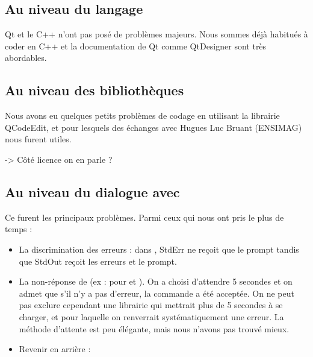 \subsection{Au niveau du langage}

Qt et le C++ n'ont pas posé de problèmes majeurs. Nous sommes déjà habitués à coder en C++ et la documentation de Qt comme QtDesigner sont très abordables.
    
\subsection{Au niveau des bibliothèques}

Nous avons eu quelques petits problèmes de codage en utilisant la librairie QCodeEdit, et pour lesquels des échanges avec Hugues Luc Bruant (ENSIMAG) nous furent utiles.


-> Côté licence on en parle ? %

\subsection{Au niveau du dialogue avec \Coq{}}

Ce furent les principaux problèmes. Parmi ceux qui nous ont pris le plus de temps :

\begin{itemize}
  \item La discrimination des erreurs : dans \coqtop{}, StdErr ne reçoit que le prompt tandis que StdOut reçoit les erreurs et le prompt. 
  \item La non-réponse de \coqtop{} (ex : pour  et ). On a choisi d'attendre 5 secondes et on admet que s'il n'y a pas d'erreur, la commande a été acceptée. On ne peut pas exclure cependant une librairie qui mettrait plus de 5 secondes à se charger, et pour laquelle on renverrait systématiquement une erreur. La méthode d'attente est peu élégante, mais nous n'avons pas trouvé mieux.
  \item Revenir en arrière : 
\end{itemize}

        
